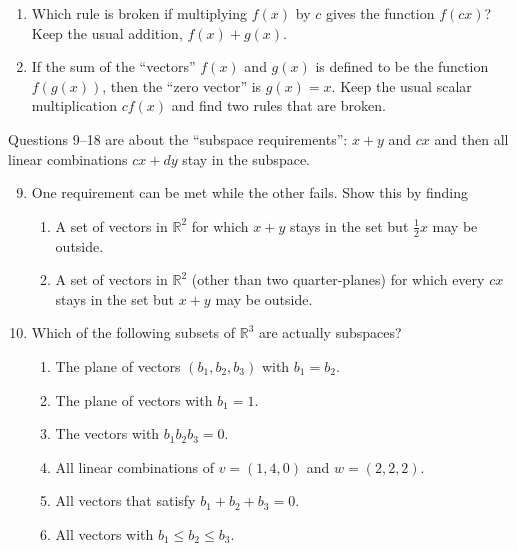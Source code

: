 \documentclass[14pt, a4paper]{article}
\begin{document}
\begin{enumerate}
    \item Which rule is broken if multiplying $f(x)$ by $c$ gives the function $f(cx)$? Keep the usual addition, $f(x)+g(x)$.

    \item If the sum of the ``vectors'' $f(x)$ and $g(x)$ is defined to be the function $f(g(x))$, then the ``zero vector'' is $g(x)=x$. Keep the usual scalar multiplication $cf(x)$ and find two rules that are broken.
\end{enumerate}

\noindent Questions 9--18 are about the ``subspace requirements'': $x+y$ and $cx$ and then all linear combinations $cx+dy$ stay in the subspace.

\begin{enumerate}
    \setcounter{enumi}{8}
    \item One requirement can be met while the other fails. Show this by finding
          \begin{enumerate}
              \item A set of vectors in $\mathbb{R}^2$ for which $x+y$ stays in the set but $\frac12 x$ may be outside.
              \item A set of vectors in $\mathbb{R}^2$ (other than two quarter-planes) for which every $cx$ stays in the set but $x+y$ may be outside.
          \end{enumerate}

    \item Which of the following subsets of $\mathbb{R}^3$ are actually subspaces?
          \begin{enumerate}
              \item The plane of vectors $(b_1,b_2,b_3)$ with $b_1 = b_2$.
              \item The plane of vectors with $b_1 = 1$.
              \item The vectors with $b_1 b_2 b_3 = 0$.
              \item All linear combinations of $v=(1,4,0)$ and $w=(2,2,2)$.
              \item All vectors that satisfy $b_1 + b_2 + b_3 = 0$.
              \item All vectors with $b_1 \le b_2 \le b_3$.
          \end{enumerate}


\end{enumerate}
\end{document}
